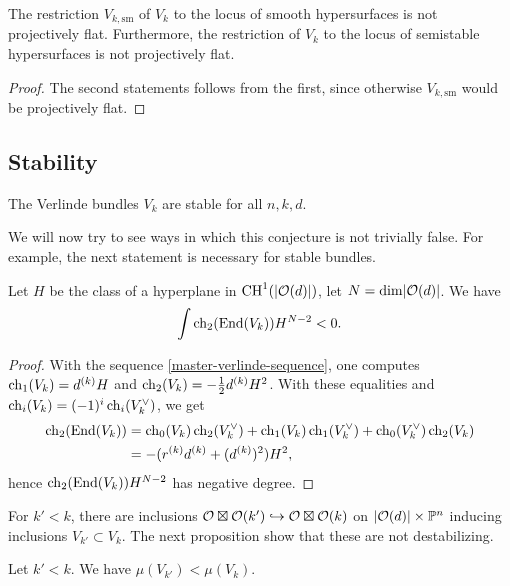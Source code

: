 \begin{corollary}
	The restriction $V_{k,\mathrm{sm}}$ of $V_k$ to the locus of smooth hypersurfaces is not projectively flat. Furthermore, the restriction of $V_k$ to the locus of semistable hypersurfaces is not projectively flat.
\end{corollary}

\begin{proof}
	The second statements follows from the first, since otherwise $V_{k,\text{sm}}$ would be projectively flat.
\end{proof}

\subsection{Stability}

\begin{conjecture}
	The Verlinde bundles $V_k$ are stable for all $n,k,d$.
\end{conjecture}

We will now try to see ways in which this conjecture is not trivially false. For example, the next statement is necessary for stable bundles.

\begin{proposition}
	Let $H$ be the class of a hyperplane in $\operatorname{CH}^1(\lvert\mathcal{O}(d)\rvert)$, let $N=\dim \lvert\mathcal{O}(d)\rvert$. We have
	\[
	\int \operatorname {ch}_2(\operatorname{End}(V_k)) H^{N-2}<0.
	\]
\end{proposition}
\begin{proof}
	With the sequence \cref{master-verlinde-sequence}, one computes $\operatorname {ch}_1(V_k)=d^{(k)}H$ and $\operatorname {ch}_2(V_k)=-\frac{1}{2}d^{(k)}H^2$. With these equalities and $\operatorname {ch}_i(V_k)=(-1)^{i}\operatorname {ch}_i(V^\vee_k)$, we get
	\begin{align*}
	\operatorname {ch}_2(\operatorname{End}(V_k)) &= \operatorname {ch}_0(V_k)\operatorname {ch}_2(V^\vee_k) + \operatorname {ch}_1(V_k)\operatorname {ch}_1(V^\vee_k) + \operatorname {ch}_0(V^\vee_k)\operatorname {ch}_2(V_k) \\
	&= -(r^{(k)}d^{(k)}+(d^{(k)})^2) H^2,
	\end{align*}
	hence $\operatorname {ch}_2(\operatorname{End}(V_k)) H^{N-2}$ has negative degree.
\end{proof}

For $k'< k$, there are inclusions $\mathcal{O}\boxtimes \mathcal{O}(k')\hookrightarrow \mathcal{O} \boxtimes \mathcal{O}(k)$ on $\lvert\mathcal{O}(d)\rvert \times \mathbb{P}^n$ inducing inclusions $V_{k'}\subset V_{k}$. The next proposition show that these are not destabilizing.

\begin{proposition}
	Let $k'<k$. We have $\mu(V_{k'}) < \mu(V_{k})$.
\end{proposition}

